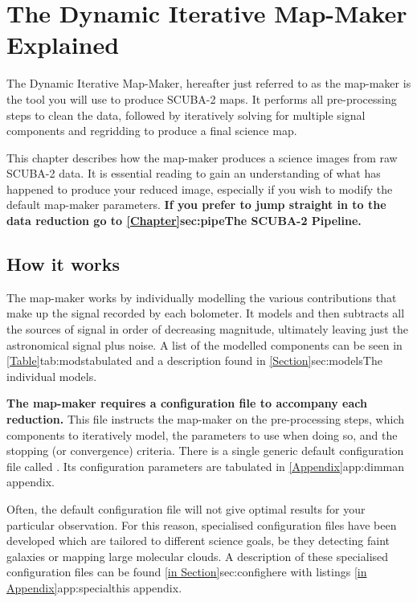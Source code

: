\chapter{The Dynamic Iterative Map-Maker Explained}
\label{sec:dimm}

The Dynamic Iterative Map-Maker, hereafter just referred to as the
map-maker is the tool you will use to produce SCUBA-2 maps. It
performs all pre-processing steps to clean the data, followed by
iteratively solving for multiple signal components and regridding to
produce a final science map.

This chapter describes how the map-maker produces a science images
from raw SCUBA-2 data. It is essential reading to gain an
understanding of what has happened to produce your reduced image,
especially if you wish to modify the default map-maker parameters.
\color{red}\textbf{ If you prefer to jump straight in to the data reduction go
to \cref{Chapter}{sec:pipe}{The SCUBA-2 Pipeline}.}\color{black}


\section{How it works}

The map-maker works by individually modelling the various
contributions that make up the signal recorded by each bolometer. It
models and then subtracts all the sources of signal in order of
decreasing magnitude, ultimately leaving just the astronomical signal
plus noise. A list of the modelled components can be seen in
\cref{Table}{tab:mods}{tabulated} and a description found in
\cref{Section}{sec:models}{The individual models}.

\textbf{The map-maker requires a configuration file to accompany each
  reduction.} This file instructs the map-maker on the pre-processing
steps, which components to iteratively model, the parameters to use
when doing so, and the stopping (or convergence) criteria.  There is a
single generic default configuration file called
.  Its configuration parameters are tabulated in
\cref{Appendix}{app:dimm}{an appendix}.

Often, the default configuration file will not give optimal results
for your particular observation. For this reason, specialised
configuration files have been developed which are tailored to
different science goals, be they detecting faint galaxies or mapping
large molecular clouds. A description of these specialised
configuration files can be found \cref{in Section}{sec:config}{here}
with listings \cref{in Appendix}{app:special}{this appendix}.


